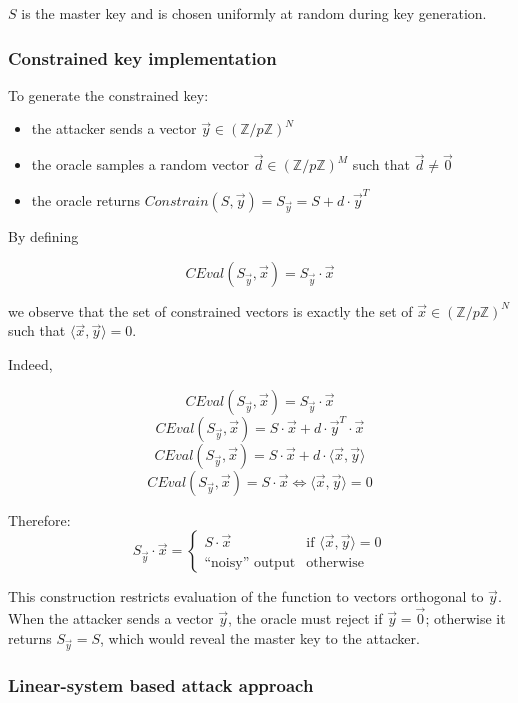 \documentclass[9pt]{extarticle}
\begin{document}
$S$ is the master key and is chosen uniformly at random during key generation.

\subsubsection{Constrained key implementation}

To generate the constrained key:
\begin{itemize}
  \item the attacker sends a vector $\vec{y} \in (\mathbb{Z}/p\mathbb{Z})^N$
  \item the oracle samples a random vector $\vec{d} \in (\mathbb{Z}/p\mathbb{Z})^M$ such that $\vec{d} \neq \vec{0}$
  \item the oracle returns $Constrain(S, \vec{y}) = S_{\vec{y}} = S + d \cdot \vec{y}^T$
\end{itemize}

By defining

\[CEval(S_{\vec{y}}, \vec{x}) =  S_{\vec{y}} \cdot \vec{x}\]

we observe that the set of constrained vectors is exactly the set of
$\vec{x} \in (\mathbb{Z}/p\mathbb{Z})^N$ such that $\langle \vec{x},\vec{y} \rangle = 0$.

Indeed,

\[CEval(S_{\vec{y}}, \vec{x}) =  S_{\vec{y}} \cdot \vec{x}\]
\[CEval(S_{\vec{y}}, \vec{x}) =  S \cdot \vec{x} + d \cdot \vec{y}^T \cdot \vec{x}\]
\[CEval(S_{\vec{y}}, \vec{x}) =  S \cdot \vec{x} + d \cdot \langle \vec{x},\vec{y} \rangle\]
\[CEval(S_{\vec{y}}, \vec{x}) =  S \cdot \vec{x} \iff \langle \vec{x},\vec{y} \rangle = 0\]

Therefore:
\[
S_{\vec{y}} \cdot \vec{x} =
\begin{cases}
S \cdot \vec{x} & \text{if } \langle \vec{x}, \vec{y} \rangle = 0 \\
\text{``noisy'' output} & \text{otherwise}
\end{cases}
\]

This construction restricts evaluation of the function to vectors orthogonal to $\vec{y}$.
When the attacker sends a vector $\vec{y}$, the oracle must reject if $\vec{y} = \vec{0}$;
otherwise it returns $S_{\vec{y}} = S$, which would reveal the master key to the attacker.

\subsubsection{Linear-system based attack approach}
\end{document}
